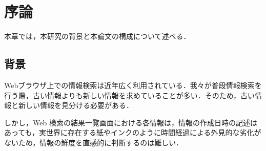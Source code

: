 \chapter{序論}
\label{chap:introduction}

本章では，本研究の背景と本論文の構成について述べる．

\newpage

\section{背景}

Webブラウザ上での情報検索は近年広く利用されている．我々が普段情報検索を行う際，古い情報よりも新しい情報を求めていることが多い．そのため，古い情報と新しい情報を見分ける必要がある．

しかし，Web 検索の結果一覧画面における各情報は，情報の作成日時の記述はあっても，実世界に存在する紙やインクのように時間経過による外見的な劣化がないため，情報の鮮度を直感的に判断するのは難しい．

